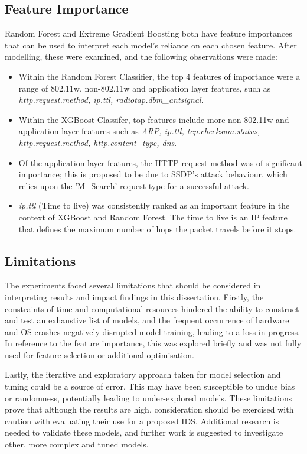 \subsection{Feature Importance}

Random Forest and Extreme Gradient Boosting both have feature importances that can be used to interpret each model's reliance on each chosen feature. After modelling, these were examined, and the following observations were made:

\begin{itemize}
	\item Within the Random Forest Classifier, the top 4 features of importance were a range of 802.11w, non-802.11w and application layer features, such as \textit{http.request.method, ip.ttl, radiotap.dbm\_antsignal}. 
	\item Within the XGBoost Classifer, top features include more non-802.11w and application layer features such as \textit{ARP, ip.ttl, tcp.checksum.status, http.request.method, http.content\_type, dns}.
	\item Of the application layer features, the HTTP request method was of significant importance; this is proposed to be due to SSDP's attack behaviour, which relies upon the 'M\_Search' request type for a successful attack.
	\item \textit{ip.ttl} (Time to live) was consistently ranked as an important feature in the context of XGBoost and Random Forest. The time to live is an IP feature that defines the maximum number of hops the packet travels before it stops. 
\end{itemize}

\subsection{Limitations}

The experiments faced several limitations that should be considered in interpreting results and impact findings in this dissertation. Firstly, the constraints of time and computational resources hindered the ability to construct and test an exhaustive list of models, and the frequent occurrence of hardware and OS crashes negatively disrupted model training, leading to a loss in progress. In reference to the feature importance, this was explored briefly and was not fully used for feature selection or additional optimisation. 

Lastly, the iterative and exploratory approach taken for model selection and tuning could be a source of error. This may have been susceptible to undue bias or randomness, potentially leading to under-explored models. These limitations prove that although the results are high, consideration should be exercised with caution with evaluating their use for a proposed IDS. Additional research is needed to validate these models, and further work is suggested to investigate other, more complex and tuned models.

